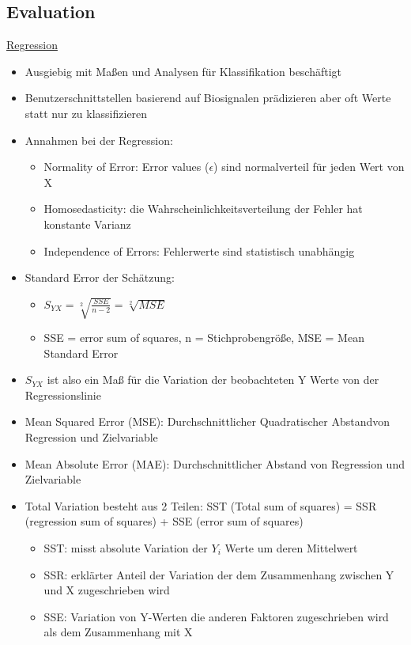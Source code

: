 \documentclass[a4paper,10pt,oneside]{article}
\begin{document}
\subsection{Evaluation}
\underline{Regression} \\
 	\begin{itemize}
 		\item Ausgiebig mit Maßen und Analysen für Klassifikation beschäftigt
 		\item Benutzerschnittstellen basierend auf Biosignalen prädizieren aber oft Werte statt nur zu klassifizieren
 		\item Annahmen bei der Regression:	
 			\begin{itemize}
 				\item Normality of Error: Error values ($\epsilon$) sind normalverteil für jeden Wert von X
 				\item Homosedasticity: die Wahrscheinlichkeitsverteilung der Fehler hat konstante Varianz
 				\item Independence of Errors: Fehlerwerte sind statistisch unabhängig
 			\end{itemize}
 		\item Standard Error der Schätzung:
 			\begin{itemize}
 				\item $S_{YX} = \sqrt[2]{\frac{SSE}{n-2}} = \sqrt[2]{MSE}$
 				\item SSE = error sum of squares, n = Stichprobengröße, MSE = Mean Standard Error
 			\end{itemize}
 		\item $S_{YX}$ ist also ein Maß für die Variation der beobachteten Y Werte von der Regressionslinie
 		\item Mean Squared Error (MSE): Durchschnittlicher Quadratischer Abstandvon Regression und Zielvariable
 		\item Mean Absolute Error (MAE): Durchschnittlicher Abstand von Regression und Zielvariable
 		\item Total Variation besteht aus 2 Teilen: SST (Total sum of squares) = SSR (regression sum of squares) + SSE (error sum of squares)
 			\begin{itemize}
 				\item SST: misst absolute Variation der $Y_i$ Werte um deren Mittelwert
 				\item SSR: erklärter Anteil der Variation der dem Zusammenhang zwischen Y und X zugeschrieben wird
 				\item SSE: Variation von Y-Werten die anderen Faktoren zugeschrieben wird als dem Zusammenhang mit X
 			\end{itemize}
 	\end{itemize}
\end{document}
